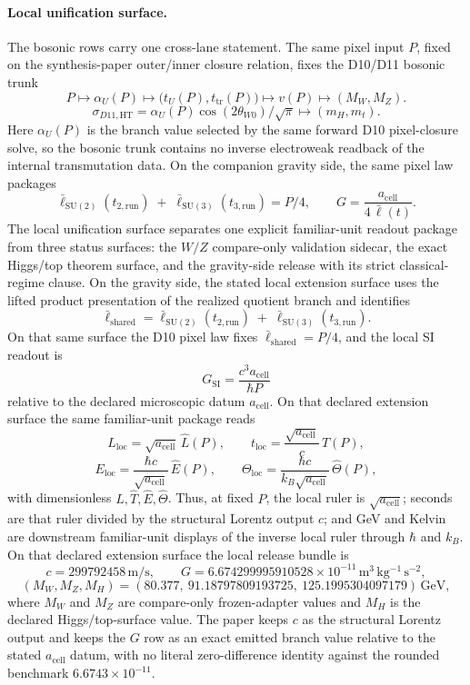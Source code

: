 \documentclass[11pt]{article}
\newcommand{\ellbar}{\bar{\ell}}
\begin{document}
\paragraph{Local unification surface.}
The bosonic rows carry one cross-lane statement. The same pixel input \(P\), fixed on the
synthesis-paper outer/inner closure relation, fixes the
D10/D11 bosonic trunk
\[
P
\longmapsto
\alpha_U(P)
\longmapsto
\bigl(t_U(P),t_{\mathrm{tr}}(P)\bigr)
\longmapsto
v(P)
\longmapsto
\left(M_W,M_Z\right).
\]
\[
\sigma_{D11,\mathrm{HT}}
=
\alpha_U(P)\cos(2\theta_{W0})/\sqrt{\pi}
\longmapsto
\left(m_H,m_t\right).
\]
Here \(\alpha_U(P)\) is the branch value selected by the same forward D10 pixel-closure solve, so
the bosonic trunk contains no inverse electroweak readback of the internal transmutation data.
On the companion gravity side, the same pixel law packages
\[
\ellbar_{\mathrm{SU(2)}}(t_{2,\mathrm{run}})
\;+\;
\ellbar_{\mathrm{SU(3)}}(t_{3,\mathrm{run}})
=
P/4,
\qquad
G=\frac{a_{\mathrm{cell}}}{4\,\ellbar(t)}.
\]
The local unification surface separates one explicit familiar-unit readout package from three
status surfaces: the \(W/Z\) compare-only validation sidecar, the exact Higgs/top theorem surface,
and the gravity-side release with its strict classical-regime clause.
On the gravity side, the stated local extension surface uses the lifted product presentation of the
realized quotient branch and identifies
\[
\ellbar_{\mathrm{shared}}
=
\ellbar_{\mathrm{SU(2)}}(t_{2,\mathrm{run}})
\;+\;
\ellbar_{\mathrm{SU(3)}}(t_{3,\mathrm{run}}).
\]
On that same surface the D10 pixel law fixes \(\ellbar_{\mathrm{shared}}=P/4\),
and the local SI readout is
\[
G_{\mathrm{SI}}=\frac{c^3 a_{\mathrm{cell}}}{\hbar P}
\]
relative to the declared microscopic datum \(a_{\mathrm{cell}}\). On that declared extension
surface the same familiar-unit package reads
\[
L_{\mathrm{loc}}=\sqrt{a_{\mathrm{cell}}}\,\widehat L(P),
\qquad
t_{\mathrm{loc}}=\frac{\sqrt{a_{\mathrm{cell}}}}{c}\,\widehat T(P),
\]
\[
E_{\mathrm{loc}}=\frac{\hbar c}{\sqrt{a_{\mathrm{cell}}}}\,\widehat E(P),
\qquad
\Theta_{\mathrm{loc}}=\frac{\hbar c}{k_B\sqrt{a_{\mathrm{cell}}}}\,\widehat\Theta(P),
\]
with dimensionless \(\widehat L,\widehat T,\widehat E,\widehat\Theta\). Thus, at fixed \(P\), the
local ruler is \(\sqrt{a_{\mathrm{cell}}}\); seconds are that ruler divided by the structural
Lorentz output \(c\); and GeV and Kelvin are downstream familiar-unit displays of the inverse
local ruler through \(\hbar\) and \(k_B\). On that declared extension
surface the local release bundle is
\[
c=299792458\,\mathrm{m/s},
\qquad
G=6.674299995910528\times10^{-11}\,\mathrm{m^3\,kg^{-1}\,s^{-2}},
\]
\[
(M_W,M_Z,M_H)=
(80.377,\ 91.18797809193725,\ 125.1995304097179)\,\mathrm{GeV},
\]
where \(M_W\) and \(M_Z\) are compare-only frozen-adapter values and \(M_H\) is the declared
Higgs/top-surface value. The paper keeps \(c\) as the structural Lorentz output and keeps the \(G\) row as an exact emitted branch
value relative to the stated \(a_{\mathrm{cell}}\) datum, with no literal zero-difference identity against the rounded benchmark
\(6.6743\times10^{-11}\).
\end{document}
